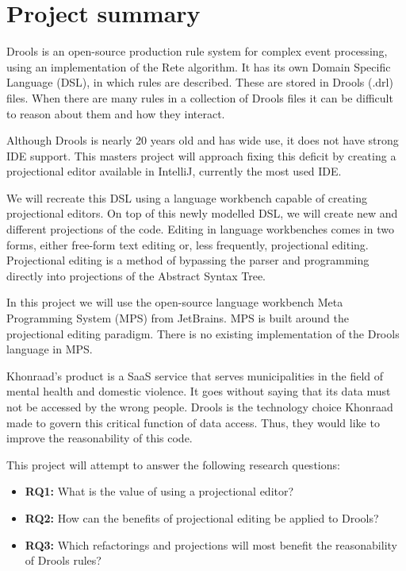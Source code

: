 \section{Project summary}

Drools\cite{browne2009jboss} is an open-source production rule system for complex event processing, using an implementation of the Rete algorithm\cite{forgy1989rete}.
It has its own Domain Specific Language (DSL), in which rules are described.
These are stored in Drools (.drl) files.
When there are many rules in a collection of Drools files it can be difficult to reason about them and how they interact.

Although Drools is nearly 20 years old and has wide use, it does not have strong IDE support.
This masters project will approach fixing this deficit by creating a projectional editor available in IntelliJ, currently the most used IDE\cite{Java_usage_report}.

We will recreate this DSL using a language workbench capable of creating projectional editors.  
On top of this newly modelled DSL, we will create new and different projections of the code. 
Editing in language workbenches comes in two forms, either free-form text editing or, less frequently, projectional editing\cite{erdweg2013state}.
Projectional editing is a method of bypassing the parser and programming directly into projections of the Abstract Syntax Tree.

In this project we will use the open-source language workbench Meta Programming System (MPS) from JetBrains\cite{MPS_ProductPage}.
MPS is built around the projectional editing paradigm.
There is no existing implementation of the Drools language in MPS.

Khonraad's product is a SaaS service that serves municipalities in the field of mental health and domestic violence.
It goes without saying that its data must not be accessed by the wrong people.
Drools is the technology choice Khonraad made to govern this critical function of data access.
Thus, they would like to improve the reasonability of this code.

This project will attempt to answer the following research questions:
\begin{itemize}
    \item \textbf{RQ1:}\label{RQ1} What is the value of using a projectional editor?
    \item \textbf{RQ2:}\label{RQ2} How can the benefits of projectional editing be applied to Drools?
    \item \textbf{RQ3:}\label{RQ3} Which refactorings and projections will most benefit the reasonability of Drools rules?
\end{itemize}